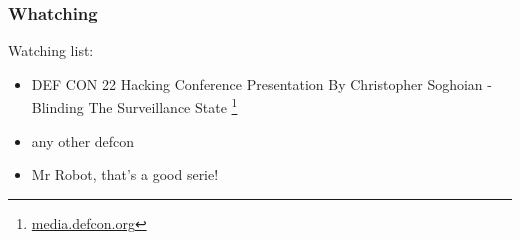   \begin{frame}
    \frametitle{Whatching}
    \begin{block}{Watching list:}
      \begin{itemize}
        \item DEF CON 22 Hacking Conference Presentation By Christopher Soghoian - Blinding The Surveillance State
        \footnote{{\color{blue}\href{https://media.defcon.org/DEF CON 22/DEF CON 22 video and slides/}{media.defcon.org}}}
        \item any other defcon
        \item Mr Robot, that's a good serie!
      \end{itemize}
    \end{block}
  \end{frame}
